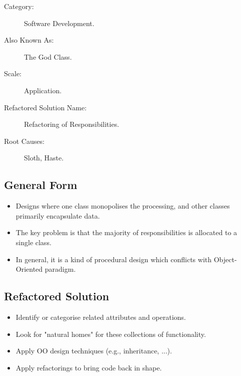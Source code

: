\begin{description}
\item[Category:]
	
	Software Development.

\item[Also Known As:]

	The God Class.

\item[Scale:]

	Application.

\item[Refactored Solution Name:]

	Refactoring of Responsibilities.

\item[Root Causes:]

	Sloth, Haste.
\end{description}



\subsection{General Form}

\begin{itemize}
\item Designs where one class monopolises the processing, and other classes primarily encapsulate data.
\item The key problem is that the majority of responsibilities is allocated to a single class.
\item In general, it is a kind of procedural design which conflicts with Object-Oriented paradigm.
\end{itemize}



\subsection{Refactored Solution}

\begin{itemize}
\item Identify or categorise related attributes and operations.
\item Look for "natural homes" for these collections of functionality.
\item Apply OO design techniques (e.g., inheritance, ...).
\item Apply refactorings to bring code back in shape.
\end{itemize}
